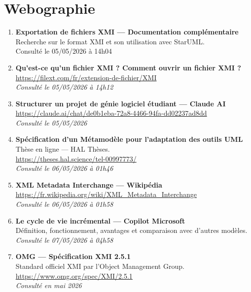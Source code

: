 \chapter*{Webographie}

\vspace*{0.5cm}

\begin{enumerate}

\item \textbf{Exportation de fichiers XMI — Documentation complémentaire}\\
Recherche sur le format XMI et son utilisation avec StarUML.\\
Consulté le 05/05/2026 à 14h04

\item \textbf{Qu'est-ce qu'un fichier XMI ? Comment ouvrir un fichier XMI ?}\\
\url{https://filext.com/fr/extension-de-fichier/XMI}\\
\textit{Consulté le 05/05/2026 à 14h12}

\item \textbf{Structurer un projet de génie logiciel étudiant — Claude AI}\\
\url{https://claude.ai/chat/de0b1eba-72a8-4466-94fa-dd02237ad8dd}\\
\textit{Consulté le 05/05/2026}

\item \textbf{Spécification d'un Métamodèle pour l'adaptation des outils UML}\\
Thèse en ligne — HAL Thèses.\\
\url{https://theses.hal.science/tel-00997773/}\\
\textit{Consulté le 06/05/2026 à 01h46}

\item \textbf{XML Metadata Interchange — Wikipédia}\\
\url{https://fr.wikipedia.org/wiki/XML_Metadata_Interchange}\\
\textit{Consulté le 06/05/2026 à 01h58}

\item \textbf{Le cycle de vie incrémental — Copilot Microsoft}\\
Définition, fonctionnement, avantages et comparaison avec d'autres modèles.\\
\textit{Consulté le 07/05/2026 à 04h58}

\item \textbf{OMG — Spécification XMI 2.5.1}\\
Standard officiel XMI par l'Object Management Group.\\
\url{https://www.omg.org/spec/XMI/2.5.1}\\
\textit{Consulté en mai 2026}


\end{enumerate}
